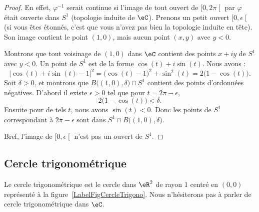 \begin{proof}
	En effet, \( \varphi^{-1}\) serait continue si l'image de tout ouvert de \( \mathopen[ 0 , 2\pi \mathclose[\) par \( \varphi\) était ouverte dans \( S^1\) (topologie induite de \( \eC\)). Prenons un petit ouvert \( \mathopen[ 0 , \epsilon \mathclose[\) (si vous êtes étonnés, c'est que vous n'avez pas bien la topologie induite en tête). Son image contient le point \( (1,0)\), mais aucun point \( (x,y)\) avec \( y<0\).

	Montrons que tout voisinage de \( (1,0)\) dans \( \eC\) contient des points \( x+iy\) de \( S^1\) avec \( y<0\). Un point de \( S^1\) est de la forme \( \cos(t)+i\sin(t)\). Nous avons :
	\begin{equation}
		| \cos(t)+i\sin(t)-1 |^2=\big( \cos(t)-1 \big)^2+\sin^2(t)=2\big( 1-\cos(t) \big).
	\end{equation}
	Soit \( \delta>0\), et montrons que \( B\big( (1,0),\delta \big)\cap S^1\) contient des points d'ordonnées négatives. D'abord il existe \( \epsilon>0\) tel que pour \( t=2\pi-\epsilon\),
	\begin{equation}
		2\big( 1-\cos(t) \big)<\delta.
	\end{equation}
	Ensuite pour de tels \( t\), nous avons \( \sin(t)<0\). Donc les points de \( S^1\) correspondant à \( 2\pi-\epsilon\) sont dans \( S^1\cap B\big( (1,0),\delta \big)\).

	Bref, l'image de \( \mathopen[ 0 , \epsilon \mathclose[\) n'est pas un ouvert de \( S^1\).
\end{proof}

\subsection{Cercle trigonométrique}

\newcommand{\CaptionFigCercleTrigono}{Le cercle trigonométrique.}


\begin{definition}
	Le cercle trigonométrique est le cercle dans \( \eR^2\) de rayon \( 1\) centré en \( (0,0)\) représenté à la figure~\ref{LabelFigCercleTrigono}. Nous n'hésiterons pas à parler de cercle trigonométrique dans \( \eC\).
\end{definition}

